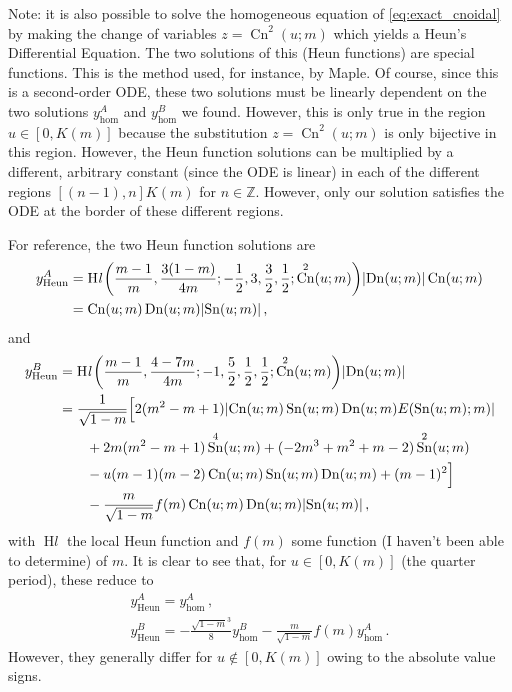 \documentclass{jfm}
\DeclareMathOperator{\cn}{Cn}
\DeclareMathOperator{\sn}{Sn}
\DeclareMathOperator{\dn}{Dn}
\DeclareMathOperator{\Heun}{H\textit{l}}
\begin{document}
Note: it is also possible to solve the homogeneous equation of
\cref{eq:exact_cnoidal} by making the change of variables $z =
\cn^2(u;m)$ which yields a Heun's Differential Equation.
The two solutions of this (Heun functions) are special functions.
This is the method used, for instance, by Maple.
Of course, since this is a second-order ODE, these two solutions must be
linearly dependent on the two solutions $y^A_{\text{hom}}$ and
$y^B_{\text{hom}}$ we found.
However, this is only true in the region $u \in [0, K(m)]$ because the
substitution $z = \cn^2(u;m)$ is only bijective in this region.
However, the Heun function solutions can be multiplied by a different,
arbitrary constant (since the ODE is linear) in each of the different
regions $[(n-1),n] K(m)$ for $n \in \mathbb{Z}$.
However, only our solution satisfies the ODE at the border of these
different regions.

For reference, the two Heun function solutions are
\begin{equation}
  \begin{split}
  y^A_{\text{Heun}} &= \Heun\pqty{\frac{m-1}{m}, \frac{3(1-m)}{4m};
    -\frac{1}{2}, 3, \frac{3}{2}, \frac{1}{2}; \cn^2(u;m)}
    \abs{\dn(u;m)} \cn(u;m) \\
    &= \cn(u;m) \dn(u;m) \abs{\sn(u;m)} \,,
  \end{split}
\end{equation}
and
\begin{equation}
  \begin{split}
  y^B_{\text{Heun}} &= \Heun\pqty{\frac{m-1}{m}, \frac{4-7m}{4m};
    -1, \frac{5}{2}, \frac{1}{2}, \frac{1}{2}; \cn^2(u;m)}
    \abs{\dn(u;m)} \\
    &= \frac{1}{\sqrt{1-m}} \Bigl[
      2(m^2 -m +1) \abs{\cn(u;m) \sn(u;m) \dn(u;m) E(\sn(u;m);m)}
      \\
    &\qquad
      + 2m(m^2-m+1) \sn^4(u;m) + (-2m^3+m^2+m-2) \sn^2(u;m) \\
    &\qquad
      - u(m-1)(m-2) \cn(u;m) \sn(u;m) \dn(u;m) + (m-1)^2 \Bigr] \\
    &\qquad
      -\frac{m}{\sqrt{1-m}} f(m) \cn(u;m) \dn(u;m) \abs{\sn(u;m)} \,,
  \end{split}
\end{equation}
with $\Heun$ the local Heun function and $f(m)$ some function (I haven't been
able to determine) of $m$.
It is clear to see that, for $u \in [0, K(m)]$ (the quarter period),
these reduce to
\begin{gather}
  y^A_{\text{Heun}} = y^A_{\text{hom}} \,, \\
  y^B_{\text{Heun}} = - \frac{\sqrt{1-m}^3}{8} y^B_{\text{hom}}
    -\frac{m}{\sqrt{1-m}} f(m) y^A_{\text{hom}} \,.
\end{gather}
However, they generally differ for $u \not\in [0, K(m)]$ owing to the
absolute value signs.
\end{document}
